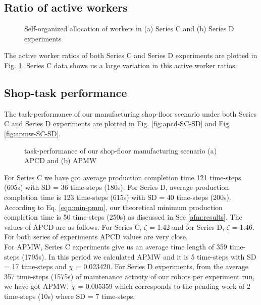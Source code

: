 \subsection*{Ratio of active workers}
\begin{figure}
\centering
{}
\caption{\small Self-organized allocation of workers in (a) Series C and (b) Series D experiments}
\label{fig:plasticity-SC-SD} 
\end{figure}
%
The active worker ratios of both Series C and Series D experiments are plotted in Fig. \ref{fig:plasticity-SC-SD}. Series C data shows us a large variation in this active worker ratios.
\subsection*{Shop-task performance}
The task-performance of our manufacturing shop-floor scenario under both Series C and Series D experiments are plotted in Fig. \ref{fig:apcd-SC-SD} and Fig. \ref{fig:apmw-SC-SD}. 
\begin{figure}
\centering
{}
\caption{\small task-performance of our shop-floor manufacturing scenario (a) APCD and (b) APMW} 
\end{figure}
For Series C we have got average production completion time 121 time-steps (605s) with SD = 36 time-steps (180s). For Series D,  average production completion time is 123 time-steps (615s) with SD = 40 time-steps (200s). According to Eq. \ref{eqn:min-pmm}, our theoretical minimum production completion time is 50 time-steps (250s) as discussed in Sec \ref{afm:results}.  The values of APCD are as follows. For Series C, $\zeta$ = 1.42 and for Series D, $\zeta$ = 1.46. For both series of experiments APCD values are very close.\\
For APMW, Series C experiments give us an average time length of 359 time-steps (1795s). In this period we calculated APMW and it is 5 time-steps with SD = 17 time-steps and $\chi$ = 0.023420. For Series D experiments, from the average 357 time-steps (1575s) of maintenance activity of our robots per experiment run, we have got APMW, $\chi$ = 0.005359 which corresponds to the pending work of 2 time-steps (10s) where SD = 7 time-steps.\\
